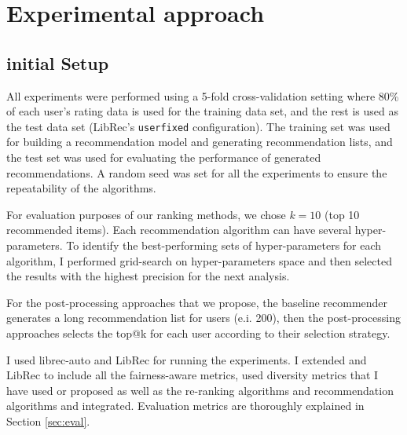\section{Experimental approach}
    
    \subsection{initial Setup}
    
    All experiments were performed using a 5-fold cross-validation setting where 80\% of each user's rating data is used for the training data set, and the rest is used as the test data set (LibRec's \texttt{userfixed} configuration). The training set was used for building a recommendation model and generating recommendation lists, and the test set was used for evaluating the performance of generated recommendations. A random seed was set for all the experiments to ensure the repeatability of the algorithms.
    
    For evaluation purposes of our ranking methods, we chose $k = 10$ (top 10 recommended items). Each recommendation algorithm can have several hyper-parameters. To identify the best-performing sets of hyper-parameters for each algorithm, I performed grid-search on hyper-parameters space and then selected the results with the highest precision for the next analysis. 
    
    
    
    For the post-processing approaches that we propose, the baseline recommender generates a long recommendation list for users (e.i. 200), then the post-processing approaches selects the top@k for each user according to their selection strategy.
    
    I used librec-auto and LibRec for running the experiments\cite{burke2020facct_libauto,Sonboli2020FARLA,guo2015librec,mansoury2019algorithm,mansoury2018automating}. I extended \libauto{} and LibRec to include all the fairness-aware metrics, used diversity metrics that I have used or proposed as well as the re-ranking algorithms and recommendation algorithms and integrated. Evaluation metrics are thoroughly explained in Section \ref{sec:eval}.

